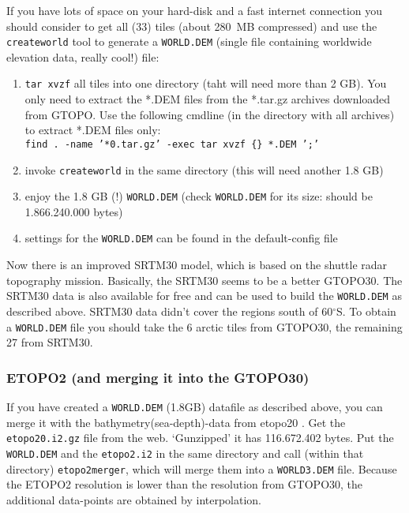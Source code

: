 If you have lots of space on your hard-disk and a fast internet connection you should consider to
get all (33) tiles (about 280~MB compressed) and use the \texttt{createworld}
tool to generate a \texttt{WORLD.DEM} (single file containing worldwide elevation data, really cool!) file:

\begin{enumerate}
\item \texttt{tar xvzf}  all tiles into one directory (taht will need more than 2 GB).
      You only need to extract the *.DEM files from the *.tar.gz archives
      downloaded from GTOPO. Use the following cmdline (in the directory with
      all archives) to extract *.DEM files only: \\
      \texttt{find . -name '*0.tar.gz' -exec tar xvzf \{\}  *.DEM ';'}

\item invoke \texttt{createworld} in the same directory (this will need another 1.8 GB)

\item enjoy the 1.8 GB (!) \texttt{WORLD.DEM} (check \texttt{WORLD.DEM} for its size:
      should be 1.866.240.000 bytes)

\item settings for the \texttt{WORLD.DEM} can be found in the default-config file

\end{enumerate}

Now there is an improved SRTM30 model, which is based on the shuttle radar topography
mission. Basically, the SRTM30 seems to be a better GTOPO30. The SRTM30 data is also available
for free  and can be used to build the \texttt{WORLD.DEM} as described above. SRTM30 data didn't cover
the regions south of 60$^\circ$S. To obtain a \texttt{WORLD.DEM} file you should take the 6 arctic
tiles from GTOPO30, the remaining 27 from SRTM30.


\subsubsection{ETOPO2 (and merging it into the GTOPO30)}
If you have created a \texttt{WORLD.DEM} (1.8GB) datafile as described above, you can merge it with the bathymetry(sea-depth)-data from etopo20 \cite{etopo2}.
Get the \texttt{etopo20.i2.gz} file from the web. `Gunzipped' it has 116.672.402 bytes.
Put the \texttt{WORLD.DEM} and the \texttt{etopo2.i2} in the same directory and call (within that directory) \texttt{etopo2merger}, which will merge them into a \texttt{WORLD3.DEM} file.
Because the ETOPO2 resolution is lower than the resolution from GTOPO30, the additional data-points are obtained by interpolation.

